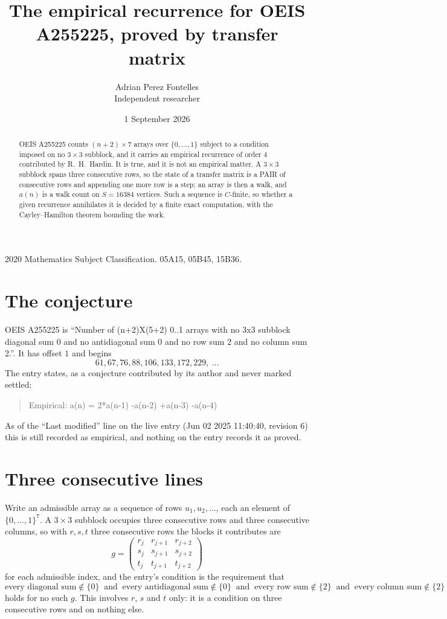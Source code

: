 \documentclass[11pt,a4paper]{article}
\title{The empirical recurrence for OEIS A255225, proved by transfer matrix}
\author{Adrian Perez Fontelles\\ \small Independent researcher}
\date{1 September 2026}
\theoremstyle{plain}
\theoremstyle{definition}
\begin{document}
\maketitle

\begin{abstract}
OEIS A255225 counts $(n+2)\times7$ arrays over $\{0,\dots,1\}$ subject to a condition imposed on
no $3\times3$ subblock, and it carries an empirical recurrence of order $4$
contributed by R.~H.~Hardin. It is true, and it is not an empirical matter. A $3\times3$
subblock spans three consecutive rows, so the state of a transfer matrix is a PAIR of
consecutive rows and appending one more row is a step; an array is then a walk, and
$a(n)$ is a walk count on $S=16384$ vertices. Such a sequence is $C$-finite, so whether a given
recurrence annihilates it is decided by a finite exact computation, with the Cayley--Hamilton
theorem bounding the work.
\end{abstract}

\noindent\small 2020 Mathematics Subject Classification. 05A15, 05B45, 15B36.\normalsize

\section{The conjecture}

OEIS A255225 is ``Number of (n+2)X(5+2) 0..1 arrays with no 3x3 subblock diagonal sum 0 and no antidiagonal sum 0 and no row sum 2 and no column sum 2.''. It has offset $1$ and begins
\[
61, 67, 76, 88, 106, 133, 172, 229,\ \dots
\]
The entry states, as a conjecture contributed by its author and never marked settled:
\begin{quote}
Empirical: a(n) = 2*a(n-1) -a(n-2) +a(n-3) -a(n-4)
\end{quote}
As of the ``Last modified'' line on the live entry (Jun 02 2025 11:40:40, revision 6) this is still
recorded as empirical, and nothing on the entry records it as proved.

\section{Three consecutive lines}

Write an admissible array as a sequence of rows $u_1,u_2,\dots$, each an element of
$\{0,\dots,1\}^{7}$. A $3\times3$ subblock occupies three consecutive rows and
three consecutive columns, so with $r,s,t$ three consecutive rows the blocks it
contributes are
\[
g=\begin{pmatrix}r_j&r_{j+1}&r_{j+2}\\ s_j&s_{j+1}&s_{j+2}\\ t_j&t_{j+1}&t_{j+2}\end{pmatrix}
\]
for each admissible index, and the entry's condition is the requirement that
\[
\text{every diagonal sum} \notin \{0\}\ \text{ and }\ \text{every antidiagonal sum} \notin \{0\}\ \text{ and }\ \text{every row sum} \notin \{2\}\ \text{ and }\ \text{every column sum} \notin \{2\}
\]
holds for no such $g$. This involves $r$, $s$ and $t$ only: it is a condition on
three consecutive rows and on nothing else.
\end{document}

